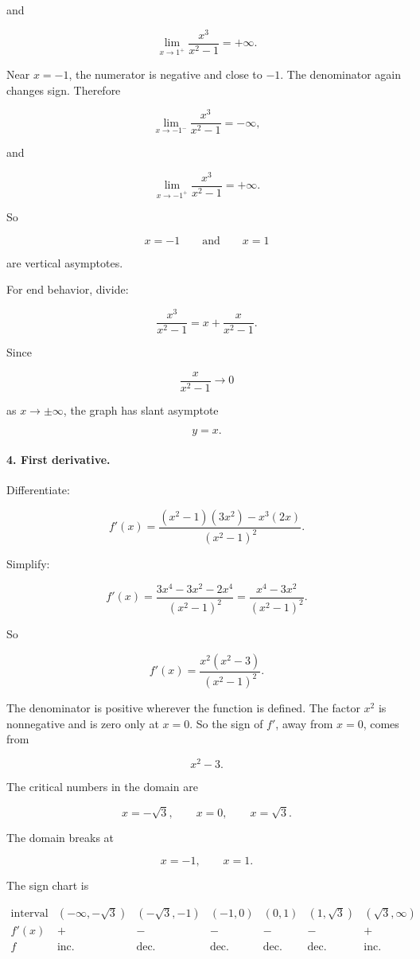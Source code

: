 and

\[
\lim_{x\to1^+}\frac{x^3}{x^2-1}=+\infty.
\]

Near \(x=-1\), the numerator is negative and close to \(-1\).  The denominator
again changes sign.  Therefore

\[
\lim_{x\to-1^-}\frac{x^3}{x^2-1}=-\infty,
\]

and

\[
\lim_{x\to-1^+}\frac{x^3}{x^2-1}=+\infty.
\]

So

\[
x=-1
\qquad\text{and}\qquad
x=1
\]

are vertical asymptotes.

For end behavior, divide:

\[
\frac{x^3}{x^2-1}
=
x+\frac{x}{x^2-1}.
\]

Since

\[
\frac{x}{x^2-1}\to0
\]

as \(x\to\pm\infty\), the graph has slant asymptote

\[
y=x.
\]

\paragraph{4. First derivative.}
Differentiate:

\[
f'(x)
=
\frac{(x^2-1)(3x^2)-x^3(2x)}{(x^2-1)^2}.
\]

Simplify:

\[
f'(x)
=
\frac{3x^4-3x^2-2x^4}{(x^2-1)^2}
=
\frac{x^4-3x^2}{(x^2-1)^2}.
\]

So

\[
f'(x)=\frac{x^2(x^2-3)}{(x^2-1)^2}.
\]

The denominator is positive wherever the function is defined.  The factor \(x^2\) is
nonnegative and is zero only at \(x=0\).  So the sign of \(f'\), away from \(x=0\),
comes from

\[
x^2-3.
\]

The critical numbers in the domain are

\[
x=-\sqrt3,\qquad x=0,\qquad x=\sqrt3.
\]

The domain breaks at

\[
x=-1,\qquad x=1.
\]

The sign chart is

\[
\begin{array}{c|cccccc}
\text{interval}
& (-\infty,-\sqrt3)
& (-\sqrt3,-1)
& (-1,0)
& (0,1)
& (1,\sqrt3)
& (\sqrt3,\infty) \\ \hline
f'(x)
& +
& -
& -
& -
& -
& + \\[2pt]
f
& \text{inc.}
& \text{dec.}
& \text{dec.}
& \text{dec.}
& \text{dec.}
& \text{inc.}
\end{array}
\]

